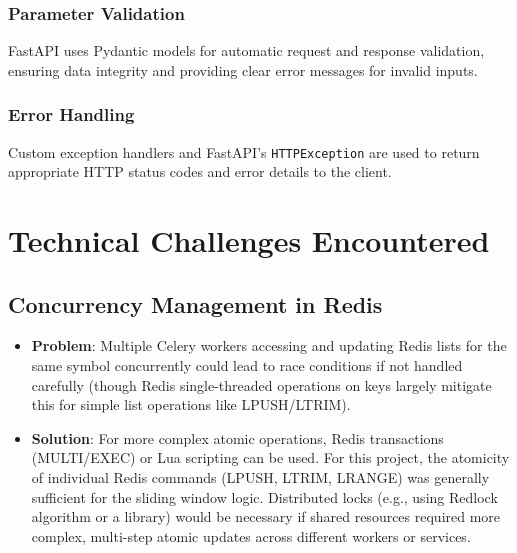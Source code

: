 \subsubsection{Parameter Validation}
FastAPI uses Pydantic models for automatic request and response validation, ensuring data integrity and providing clear error messages for invalid inputs.

\subsubsection{Error Handling}
Custom exception handlers and FastAPI's \texttt{HTTPException} are used to return appropriate HTTP status codes and error details to the client.

\section{Technical Challenges Encountered}

\subsection{Concurrency Management in Redis}
\begin{itemize}
    \item \textbf{Problem}: Multiple Celery workers accessing and updating Redis lists for the same symbol concurrently could lead to race conditions if not handled carefully (though Redis single-threaded operations on keys largely mitigate this for simple list operations like LPUSH/LTRIM).
    \item \textbf{Solution}: For more complex atomic operations, Redis transactions (MULTI/EXEC) or Lua scripting can be used. For this project, the atomicity of individual Redis commands (LPUSH, LTRIM, LRANGE) was generally sufficient for the sliding window logic. Distributed locks (e.g., using Redlock algorithm or a library) would be necessary if shared resources required more complex, multi-step atomic updates across different workers or services.
\end{itemize}

